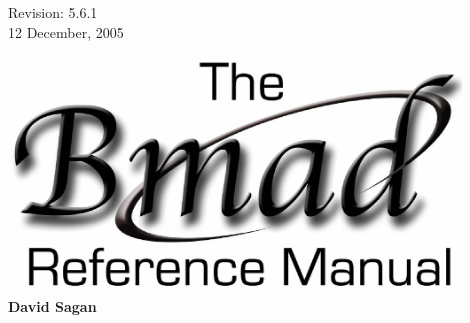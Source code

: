 \thispagestyle{empty}

\begin{flushright}
\large
  Revision: 5.6.1 \\
  12 December, 2005 \\
\end{flushright}

\vfill

{
\begin{center}
\includegraphics[width=12cm]{bmad_ref_manual.eps} \\
\vskip 0.3in
\huge\bf David Sagan
\end{center}
}

\vfill
\break